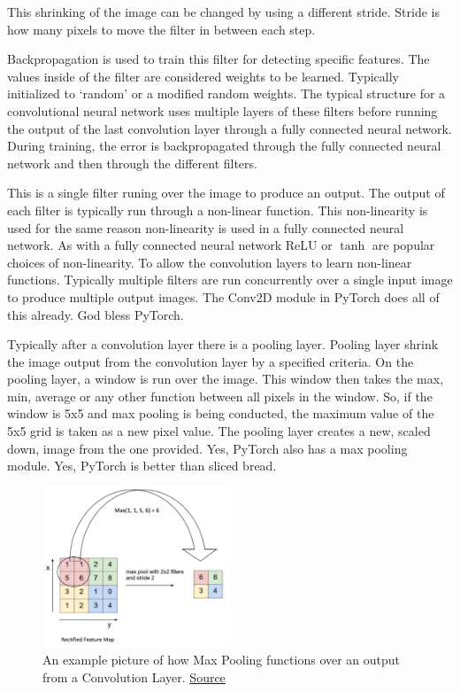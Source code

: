 This shrinking of the image can be changed by using a different stride.
Stride is how many pixels to move the filter in between each step.

Backpropagation is used to train this filter for detecting specific features.
The values inside of the filter are considered weights to be learned.
Typically initialized to `random' or a modified random weights.
The typical structure for a convolutional neural network uses multiple layers of these filters before running the output of the last convolution layer through a fully connected neural network.
During training, the error is backpropagated through the fully connected neural network and then through the different filters.

This is a single filter runing over the image to produce an output.
The output of each filter is typically run through a non-linear function.
This non-linearity is used for the same reason non-linearity is used in a fully connected neural network.
As with a fully connected neural network ReLU or $\tanh$ are popular choices of non-linearity.
To allow the convolution layers to learn non-linear functions.
Typically multiple filters are run concurrently over a single input image to produce multiple output images.
The Conv2D module in PyTorch does all of this already.
God bless PyTorch.

Typically after a convolution layer there is a pooling layer.
Pooling layer shrink the image output from the convolution layer by a specified criteria.
On the pooling layer, a window is run over the image.
This window then takes the max, min, average or any other function between all pixels in the window.
So, if the window is 5x5 and max pooling is being conducted, the maximum value of the 5x5 grid is taken as a new pixel value.
The pooling layer creates a new, scaled down, image from the one provided.
Yes, PyTorch also has a max pooling module.
Yes, PyTorch is better than sliced bread.

\begin{figure}[ht]
  \centering
      \includegraphics[width=0.5\textwidth]{figs/MaxPooling.png}
          \caption{
            An example picture of how Max Pooling functions over an output from a Convolution Layer.
            \href{https://ulkarn.me/2016/08/11/intuitive-explanation-convnets/}{Source}
          }
\end{figure}

